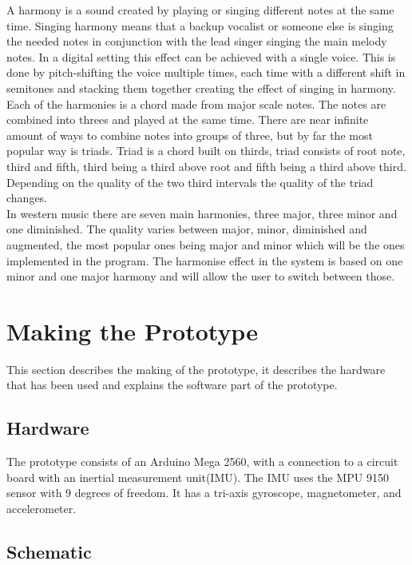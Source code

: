 A harmony is a sound created by playing or singing different notes at the same time\citep{Harmonise02}.
Singing harmony means that a backup vocalist or someone else is singing the needed notes in conjunction with the lead singer singing the main melody notes. In a digital setting this effect can be achieved with a single voice. This is done by pitch-shifting the voice multiple times, each time with a different shift in semitones and stacking them together creating the effect of singing in harmony. Each of the harmonies is a chord made from major scale notes.
The notes are combined into threes and played at the same time. There are near infinite amount of ways to combine notes into groups of three, but by far the most popular way is triads\citep{Harmonise01}. Triad is a chord built on thirds, triad consists of root note, third and fifth, third being a third above root and fifth being a third above third. Depending on the quality of the two third intervals the quality of the triad changes. \\
In western music there are seven main harmonies, three major, three minor and one diminished. The quality varies between major, minor, diminished and augmented, the most popular ones being major and minor which will be the ones implemented in the program. The harmonise effect in the system is based on one minor and one major harmony and will allow the user to switch between those.

\section{Making the Prototype}

This section describes the making of the prototype, it describes the hardware that has been used and explains the software part of the prototype.

\subsection{Hardware}

The prototype consists of an Arduino Mega 2560\citep{Arduino}, with a connection to a circuit board with an inertial measurement unit(IMU). 
The IMU uses the MPU 9150 sensor with 9 degrees of freedom\citep{MPU}. It has a tri-axis gyroscope, magnetometer, and accelerometer.

\subsection{Schematic} 

